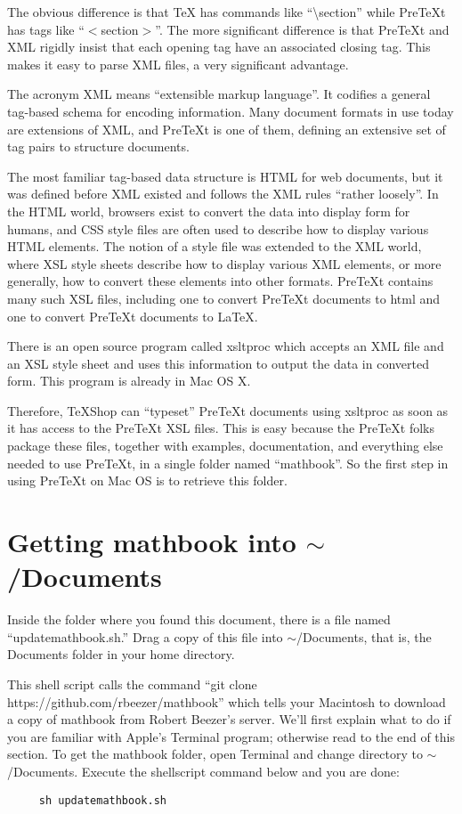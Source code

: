 \documentclass[11pt, oneside]{article}   	%
\begin{document}
The obvious difference is that TeX has commands like ``\textbackslash section'' while PreTeXt has tags like ``$<$section$>$''. The more significant difference is that PreTeXt and XML rigidly insist that each opening tag have an associated closing tag. This makes it easy to parse XML files, a very significant advantage. 

The acronym XML means ``extensible markup language''. It codifies a general tag-based schema for encoding information.  Many document formats in use today are extensions of XML, and PreTeXt is one of them, defining an extensive set of tag pairs to structure documents. 

The most familiar tag-based data structure is HTML for web documents, but it was defined before XML existed and follows the XML rules  ``rather loosely''.  In the HTML world, browsers exist to convert the data into display form for humans, and CSS style files are often used to describe how to display various HTML elements. The notion of a style file was  extended to the XML world, where XSL style sheets describe how to display various XML elements, or more generally, how to convert these elements into other formats. PreTeXt contains many such XSL files, including one to convert PreTeXt documents to html and one to convert PreTeXt documents to LaTeX.

There is an open source program called xsltproc which accepts an XML file and an XSL style sheet and uses this information to output the data in converted form. This program is already in Mac OS X.

Therefore, TeXShop can ``typeset'' PreTeXt documents using xsltproc as soon as it has access to the PreTeXt  XSL files. This is easy because the PreTeXt folks package these files, together with examples, documentation, and everything else needed to use PreTeXt, in a single folder named ``mathbook''. So the first step in using PreTeXt on Mac OS is to retrieve this folder. 

\section{Getting mathbook into $\sim$/Documents}

Inside the folder  where you found this document, there is a file named ``updatemathbook.sh.'' Drag a copy of this file into $\sim$/Documents, that is, the Documents folder in your home directory. 

This shell  script calls the command 
     ``git clone https://github.com/rbeezer/mathbook''
which tells your Macintosh to download a copy of mathbook from Robert Beezer's server. We'll first explain what to do if you are familiar with Apple's Terminal program; otherwise read to the end of this section. To get  the mathbook folder,  open Terminal and change directory to $\sim$/Documents. Execute the shellscript command 
below and you are done:
\begin{verbatim}
     sh updatemathbook.sh
\end{verbatim}
\end{document}
